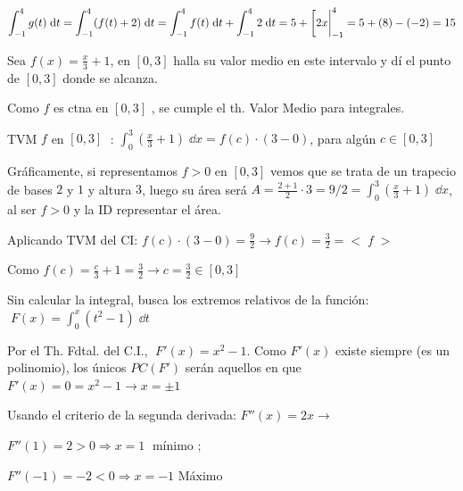 \begin{proofw}\renewcommand{\qedsymbol}{$\diamond$}		
	$\displaystyle \int_{-1}^4 g(t)\; \dd t = \int_{-1}^4 (f(t)+2)\; \dd t =\int_{-1}^4 f(t)\; \dd t +\int_{-1}^4 2\; \dd t = 5 + \eval[2x|_{-1}^4=
	5+ (8)-(-2)=15$	
\end{proofw}
	



\begin{ejre}
Sea $f(x)=\frac x 3 + 1$, en $[0,3]$	 halla su valor medio en este intervalo y dí el punto de $[0,3]$	donde se alcanza.
\end{ejre}

\begin{proofw}\renewcommand{\qedsymbol}{$\diamond$}	


Como $f$ es ctna en $[0,3]$	, se cumple el th. Valor Medio para integrales.

TVM $f$ en $[0,3]\; $	: $\displaystyle \int_0^3 (\frac x 3 + 1 ) \; \dd x = f(c)\cdot (3-0) $, para algún $c\in [0,3]$	

Gráficamente, si representamos $f>0$ en $[0,3]$	 vemos que se trata de un trapecio de bases $2$ y $1$ y altura $3$, luego su área será $A=\frac {2+1}{2}\cdot 3=9/2=\displaystyle \int_0^3 (\frac x 3 + 1 ) \; \dd x$, al ser $f>0$ y la ID representar el área.

Aplicando TVM del CI: $f(c)\cdot (3-0)=\frac 9 2 \to f(c)=\frac 3 2 = <\;  f \; >$

Como $f(c)=\frac c 3 + 1 = \frac 3 2 \to c=\frac 3 2 \in [0,3]$ 
\end{proofw}


\begin{ejre}
Sin calcular la integral, busca los extremos relativos de la función:
$\; \displaystyle F(x)=\int_0^x	 (t^2-1)\; \dd t$
\end{ejre}

\begin{proofw}\renewcommand{\qedsymbol}{$\diamond$}	

Por el Th. Fdtal. del C.I., $\; F'(x)=x^2-1$. Como $F'(x)$ existe siempre (es un polinomio), los únicos $PC(F')$ serán aquellos en que $F'(x)=0=x^2-1 \to x=\pm 1$

Usando el criterio de la segunda derivada: $F''(x)=2x\to $

\hspace{15mm} $F''(1)=2>0\Rightarrow x=1 \; \text{ mínimo }	; $

\hspace{15mm} $ F''(-1)=-2<0 \Rightarrow x=-1 \text{ Máximo} $	

\end{proofw}

